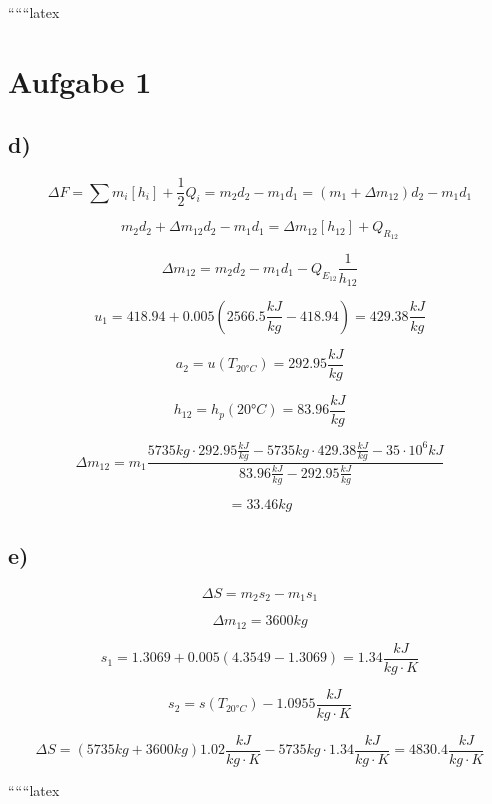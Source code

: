 ``````latex


\section*{Aufgabe 1}

\subsection*{d)}

\[
\Delta F = \sum m_i [h_i] + \frac{1}{2} Q_i = m_2 d_2 - m_1 d_1 = (m_1 + \Delta m_{12}) d_2 - m_1 d_1
\]

\[
m_2 d_2 + \Delta m_{12} d_2 - m_1 d_1 = \Delta m_{12} [h_{12}] + Q_{R_{12}}
\]

\[
\Delta m_{12} = m_2 d_2 - m_1 d_1 - Q_{E_{12}} \frac{1}{h_{12}}
\]

\[
u_1 = 418.94 + 0.005 (2566.5 \frac{kJ}{kg} - 418.94) = 429.38 \frac{kJ}{kg}
\]

\[
a_2 = u(T_{20°C}) = 292.95 \frac{kJ}{kg}
\]

\[
h_{12} = h_p (20°C) = 83.96 \frac{kJ}{kg}
\]

\[
\Delta m_{12} = m_1 \frac{5735 kg \cdot 292.95 \frac{kJ}{kg} - 5735 kg \cdot 429.38 \frac{kJ}{kg} - 35 \cdot 10^6 kJ}{83.96 \frac{kJ}{kg} - 292.95 \frac{kJ}{kg}}
\]

\[
= 33.46 kg
\]

\subsection*{e)}

\[
\Delta S = m_2 s_2 - m_1 s_1
\]

\[
\Delta m_{12} = 3600 kg
\]

\[
s_1 = 1.3069 + 0.005 (4.3549 - 1.3069) = 1.34 \frac{kJ}{kg \cdot K}
\]

\[
s_2 = s(T_{20°C}) - 1.0955 \frac{kJ}{kg \cdot K}
\]

\[
\Delta S = (5735 kg + 3600 kg) 1.02 \frac{kJ}{kg \cdot K} - 5735 kg \cdot 1.34 \frac{kJ}{kg \cdot K} = 4830.4 \frac{kJ}{kg \cdot K}
\]

``````latex


